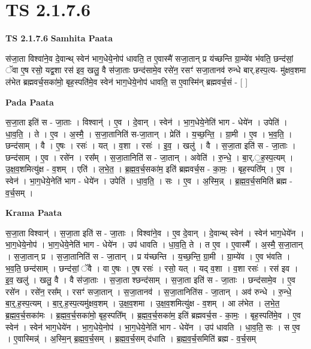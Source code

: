 \documentclass[17pt]{extarticle}
\begin{document}
\section{ TS 2.1.7.6 }

\textbf{TS 2.1.7.6 } \newline
\textbf{Samhita Paata} \newline

स॑जा॒ता विश्वा॑ने॒व दे॒वान्थ् स्वेन॑ भाग॒धेये॒नोप॑ धावति॒ त ए॒वास्मै॑ सजा॒तान् प्र य॑च्छन्ति ग्रा॒म्ये॑व भ॑वति॒ छन्द॑सां॒ ॅवा ए॒ष रसो॒ यद्व॒शा रस॑ इव॒ खलु॒ वै स॑जा॒ताः छन्द॑सामे॒व रसे॑न॒ रसꣳ॑ सजा॒तानव॑ रुन्धे बार्.हस्प॒त्य- मु॑क्षव॒शमा ल॑भेत ब्रह्मवर्च॒सका॑मो॒ बृह॒स्पति॑मे॒व स्वेन॑ भाग॒धेये॒नोप॑ धावति॒ स ए॒वास्मि॑न् ब्रह्मवर्च॒सं - [  ] \newline

\textbf{Pada Paata} \newline

स॒जा॒ता इति॑ स - जा॒ताः । विश्वान्॑ । ए॒व । दे॒वान् । स्वेन॑ । भा॒ग॒धेये॒नेति॑ भाग - धेये॑न । उपेति॑ । धा॒व॒ति॒ । ते । ए॒व । अ॒स्मै॒ । स॒जा॒तानिति॑ स-जा॒तान् । प्रेति॑ । य॒च्छ॒न्ति॒ । ग्रा॒मी । ए॒व । भ॒व॒ति॒ । छन्द॑साम् । वै । ए॒षः । रसः॑ । यत् । व॒शा । रसः॑ । इ॒व॒ । खलु॑ । वै । स॒जा॒ता इति॑ स - जा॒ताः । छन्द॑साम् । ए॒व । रसे॑न । रस᳚म् । स॒जा॒तानिति॑ स - जा॒तान् । अवेति॑ । रु॒न्धे॒ । बा॒र्.॒ह॒स्प॒त्यम् । उ॒क्ष॒व॒शमित्यु॑क्ष - व॒शम् । एति॑ । ल॒भे॒त॒ । ब्र॒ह्म॒व॒र्च॒सका॑म॒ इति॑ ब्रह्मवर्च॒स - का॒मः॒ । बृह॒स्पति᳚म् । ए॒व । स्वेन॑ । भा॒ग॒धेये॒नेति॑ भाग - धेये॑न । उपेति॑ । धा॒व॒ति॒ । सः । ए॒व । अ॒स्मि॒न्न् । ब्र॒ह्म॒व॒र्च॒समिति॑ ब्रह्म - व॒र्च॒सम् ।  \newline


\textbf{Krama Paata} \newline

स॒जा॒ता विश्वान्॑ । स॒जा॒ता इति॑ स - जा॒ताः । विश्वा॑ने॒व । ए॒व दे॒वान् । दे॒वान्थ् स्वेन॑ । स्वेन॑ भाग॒धेये॑न । भा॒ग॒धेये॒नोप॑ । भा॒ग॒धेये॒नेति॑ भाग - धेये॑न । उप॑ धावति । धा॒व॒ति॒ ते । त ए॒व । ए॒वास्मै᳚ । अ॒स्मै॒ स॒जा॒तान् । स॒जा॒तान् प्र । स॒जा॒तानिति॑ स - जा॒तान् । प्र य॑च्छन्ति । य॒च्छ॒न्ति॒ ग्रा॒मी । ग्रा॒म्ये॑व । ए॒व भ॑वति । भ॒व॒ति॒ छन्द॑साम् । छन्द॑सां॒ ॅवै । वा ए॒षः । ए॒ष रसः॑ । रसो॒ यत् । यद् व॒शा । व॒शा रसः॑ । रस॑ इव । इ॒व॒ खलु॑ । खलु॒ वै । वै स॑जा॒ताः । स॒जा॒ता श्छन्द॑साम् । स॒जा॒ता इति॑ स - जा॒ताः । छन्द॑सामे॒व । ए॒व रसे॑न । रसे॑न॒ रस᳚म् । रसꣳ॑ सजा॒तान् । स॒जा॒तानव॑ । स॒जा॒तानिति॑स - जा॒तान् । अव॑ रुन्धे । रु॒न्धे॒ बा॒र्॒.ह॒स्प॒त्यम् । बा॒र्॒.ह॒स्प॒त्यमु॑क्षव॒शम् । उ॒क्ष॒व॒शमा । उ॒क्ष॒व॒शमित्यु॑क्ष - व॒शम् । आ ल॑भेत । ल॒भे॒त॒ ब्र॒ह्म॒व॒र्च॒सका॑मः । ब्र॒ह्म॒व॒र्च॒सका॑मो॒ बृह॒स्पति᳚म् । ब्र॒ह्म॒व॒र्च॒सका॑म॒ इति॑ ब्रह्मवर्च॒स - का॒मः॒ । बृह॒स्पति॑मे॒व । ए॒व स्वेन॑ । स्वेन॑ भाग॒धेये॑न । भा॒ग॒धेये॒नोप॑ । भा॒ग॒धेये॒नेति॑ भाग - धेये॑न । उप॑ धावति । धा॒व॒ति॒ सः । स ए॒व । ए॒वास्मिन्न्॑ । अ॒स्मि॒न् ब्र॒ह्म॒व॒र्च॒सम् । ब्र॒ह्म॒व॒र्च॒सम् द॑धाति । ब्र॒ह्म॒व॒र्च॒समिति॑ ब्रह्म - व॒र्च॒सम् \newline
\end{document}
